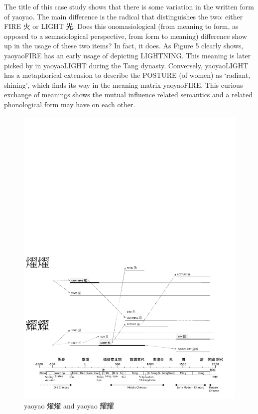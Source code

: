 \documentclass[12pt,article,oneside]{memoir}
\theoremstyle{definition}
\theoremstyle{definition}
\theoremstyle{definition}
\theoremstyle{remark}
\begin{document}
The title of this case study shows that there is some variation in the
written form of yaoyao. The main difference is the radical that
distinguishes the two: either FIRE 火 or LIGHT 光. Does this
onomasiological (from meaning to form, as opposed to a semasiological
perspective, from form to meaning) difference show up in the usage of
these two items? In fact, it does. As Figure 5 clearly shows, yaoyaoFIRE
has an early usage of depicting LIGHTNING. This meaning is later picked
by in yaoyaoLIGHT during the Tang dynasty. Conversely, yaoyaoLIGHT has a
metaphorical extension to describe the POSTURE (of women) as `radiant,
shining', which finds its way in the meaning matrix yaoyaoFIRE. This
curious exchange of meanings shows the mutual influence related
semantics and a related phonological form may have on each other.

\begin{figure}
\centering
\includegraphics{ideos/yaoyao.pdf}
\caption{\label{fig:yaoyao}yaoyao 燿燿 and yaoyao 耀耀}
\end{figure}
\end{document}
